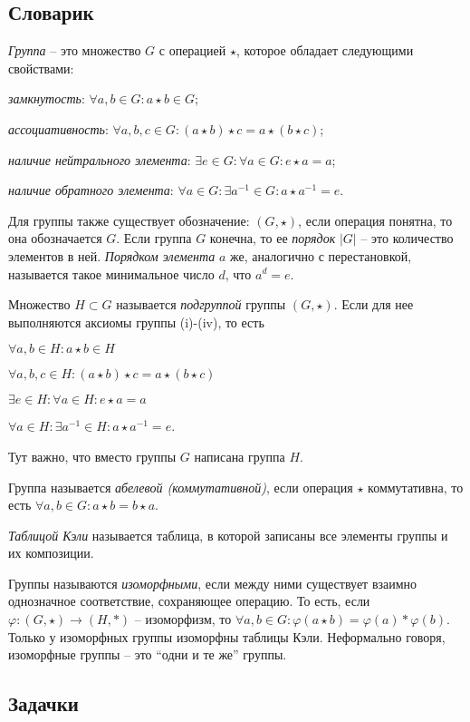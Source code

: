 \documentclass[10pt]{article}
\begin{document}
\subsection*{Словарик}
\begin{bullets}
    \item \emph{Группа} -- это множество $G$ с операцией $\star$, которое обладает следующими свойствами: 
    \begin{conditions}
        \item \textit{замкнутость}: $\forall a, b \in G: a \star b \in G$;
        \item \textit{ассоциативность}: $\forall a, b, c \in G: (a \star b) \star c = a \star (b \star c)$;
        \item \textit{наличие нейтрального элемента}: $\exists e \in G: \forall a \in G: e \star a = a$;
        \item \textit{наличие обратного элемента}: $\forall a \in G: \exists a^{-1} \in G: a \star a^{-1} = e$.
    \end{conditions}

\item Для группы также существует обозначение: $(G, \star)$, если операция понятна, то она обозначается $G$.
Если группа $G$ конечна, то ее \emph{порядок} $|G|$ -- это количество элементов в ней.
\emph{Порядком элемента} $a$ же, аналогично с перестановкой, называется такое минимальное число $d$, что $a^d = e$.

\item Множество $H \subset G$ называется \emph{подгруппой} группы $(G, \star)$. Если для нее выполняются аксиомы группы (i)-(iv), то есть \begin{inumerate}[(i)]
        \item $\forall a, b \in H: a \star b \in H$
        \item $\forall a, b, c \in H: (a \star b) \star c = a \star (b \star c)$
        \item $\exists e \in H: \forall a \in H: e \star a = a$
        \item $\forall a \in H: \exists a^{-1} \in H: a \star a^{-1} = e$. 
\end{inumerate}
Тут важно, что вместо группы $G$ написана группа $H$.

\item Группа называется \emph{абелевой (коммутативной)}, если операция $\star$ коммутативна, то есть $\forall a, b \in G: a \star b = b \star a$.

\item \emph{Таблицой Кэли} называется таблица, в которой записаны все элементы группы и их композиции. 

\item Группы называются \emph{изоморфными}, если между ними существует взаимно однозначное соответствие, сохраняющее операцию. То есть, если $\varphi: (G, \star) \to (H, *)$ -- изоморфизм, то $\forall a, b \in G: \varphi(a \star b) = \varphi(a) * \varphi(b)$. Только у изоморфных группы изоморфны таблицы Кэли. Неформально говоря, изоморфные группы -- это ``одни и те же'' группы.
\end{bullets}
\subsection*{Задачки}

\end{document}

